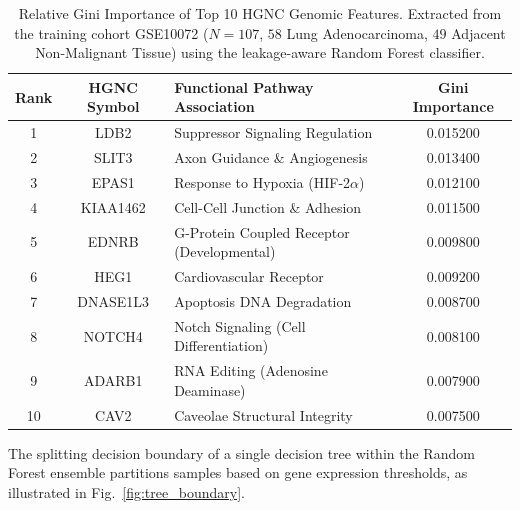 \documentclass[journal,10pt]{IEEEtran}
\begin{document}
\begin{table}[htbp]
\centering
\caption{Relative Gini Importance of Top 10 HGNC Genomic Features. Extracted from the training cohort GSE10072 ($N=107$, $58$ Lung Adenocarcinoma, $49$ Adjacent Non-Malignant Tissue) using the leakage-aware Random Forest classifier.}
\label{tab:feature_importance}
\begin{tabular}{cclc}
\toprule
\textbf{Rank} & \textbf{HGNC Symbol} & \textbf{Functional Pathway Association} & \textbf{Gini Importance} \\
\midrule
1 & LDB2 & Suppressor Signaling Regulation & 0.015200 \\
2 & SLIT3 & Axon Guidance \& Angiogenesis & 0.013400 \\
3 & EPAS1 & Response to Hypoxia (HIF-2$\alpha$) & 0.012100 \\
4 & KIAA1462 & Cell-Cell Junction \& Adhesion & 0.011500 \\
5 & EDNRB & G-Protein Coupled Receptor (Developmental) & 0.009800 \\
6 & HEG1 & Cardiovascular Receptor & 0.009200 \\
7 & DNASE1L3 & Apoptosis DNA Degradation & 0.008700 \\
8 & NOTCH4 & Notch Signaling (Cell Differentiation) & 0.008100 \\
9 & ADARB1 & RNA Editing (Adenosine Deaminase) & 0.007900 \\
10 & CAV2 & Caveolae Structural Integrity & 0.007500 \\
\bottomrule
\end{tabular}
\end{table}

The splitting decision boundary of a single decision tree within the Random Forest ensemble partitions samples based on gene expression thresholds, as illustrated in Fig.~\ref{fig:tree_boundary}.
\end{document}
